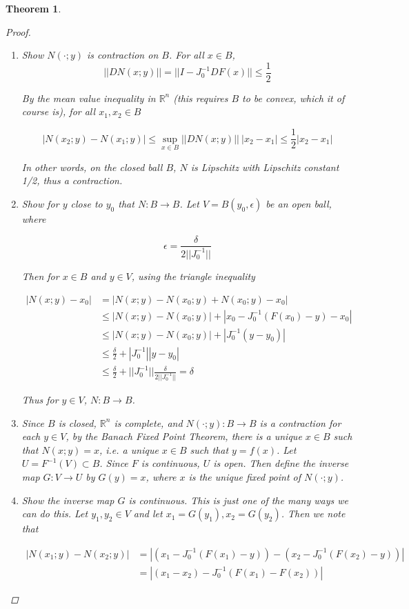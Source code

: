 \documentclass{article}
\newtheorem{theorem}{Theorem}[section]
\def\R{{\mathbb R}}
\begin{document}
\begin{theorem}
\begin{proof}
\begin{enumerate}
\item Show $N(\cdot; y)$ is contraction on $B$. For all $x \in B$, 
\[
||DN(x; y)|| = ||I - J_0^{-1} DF(x)|| \leq \frac{1}{2}
\]

By the mean value inequality in $\R^n$ (this requires $B$ to be convex, which it of course is), for all $x_1, x_2 \in B$

\[
|N(x_2; y) - N(x_1; y)| \leq \sup_{x \in B} ||DN(x; y)|| \: |x_2 - x_1| \leq \frac{1}{2}|x_2 - x_1|
\]

In other words, on the closed ball $B$, $N$ is Lipschitz with Lipschitz constant 1/2, thus a contraction. 

\item Show for $y$ close to $y_0$ that $N: B \rightarrow B$. Let $V = B(y_0, \epsilon)$ be an open ball, where

\[
\epsilon = \frac{\delta}{ 2 ||J_0^{-1}||}
\]

Then for $x \in B$ and $y \in V$, using the triangle inequality

\begin{align*}
|N(x; y) - x_0| &= |N(x; y) - N(x_0; y) + N(x_0; y) - x_0| \\
&\leq |N(x; y) - N(x_0; y)| + |x_0 - J_0^{-1}(F(x_0) - y) - x_0| \\
&\leq |N(x; y) - N(x_0; y)| + |J_0^{-1}(y - y_0)| \\
&\leq \frac{\delta}{2} + |J_0^{-1}||y - y_0| \\
&\leq \frac{\delta}{2} + ||J_0^{-1}||\frac{\delta}{ 2 ||J_0^{-1}||} = \delta 
\end{align*}

Thus for $y \in V$, $N: B \rightarrow B$.

\item Since $B$ is closed, $\R^n$ is complete, and $N(\cdot; y): B \rightarrow B$ is a contraction for each $y \in V$, by the Banach Fixed Point Theorem, there is a unique $x \in B$ such that $N(x; y) = x$, i.e. a unique $x \in B$ such that $y = f(x)$. Let $U = F^{-1}(V) \subset B$. Since $F$ is continuous, $U$ is open. Then define the inverse map $G: V \rightarrow U$ by $G(y) = x$, where $x$ is the unique fixed point of $N(\cdot; y)$.

\item Show the inverse map $G$ is continuous. This is just one of the many ways we can do this. Let $y_1, y_2 \in V$ and let $x_1 = G(y_1), x_2 = G(y_2)$. Then we note that

\begin{align*}
|N(x_1; y) - N(x_2; y)| &= |(x_1 - J_0^{-1}(F(x_1) - y)) - (x_2 - J_0^{-1}(F(x_2) - y))| \\
&= |(x_1 - x_2) - J_0^{-1} (F(x_1) - F(x_2))|
\end{align*}


\end{enumerate}
\end{proof}
\end{theorem}
\end{document}
